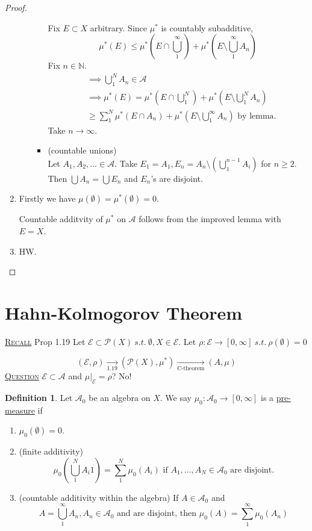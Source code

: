 \documentclass{report}
\newcommand{\N}{\mathbb{N}}
\newcommand{\st}{\ s.t.\ }
\newcommand{\fancyem}[1]{\underline{\textsc{#1}}}
\theoremstyle{definition}
\newtheorem{definition}[theorem]{Definition}
\theoremstyle{remark}
\begin{document}
\begin{proof}
\begin{enumerate}
\begin{enumerate}
\begin{itemize}
		Fix $E \subset X$ arbitrary.
		Since $\mu^*$ is countably subadditive, 
		\[
		\mu^*(E) \leq \mu^*\left(E \cap \bigcup_1^\infty\right) + \mu^*\left(E \setminus \bigcup_1^\infty A_n\right)
		\]
		Fix $n \in \N.$
		\begin{align*}
		& \implies \bigcup_1^N A_n \in \mathcal{A} \\
		& \implies \mu^*(E) = \mu^*\left(E \cap \bigcup_1^N\right) + \mu^*\left(E \setminus \bigcup_1^N A_n\right) \\
		& \geq \sum_{1}^N \mu^*(E \cap A_n) + \mu^*\left(E \setminus \bigcup_1^\infty A_n\right) \text{ by lemma}.
		\end{align*}
		Take $n \to \infty.$
		\item
		(countable unions)\\
		Let $A_1, A_2, \ldots \in \mathcal{A}.$ Take $E_1 = A_1, E_n = A_n \setminus \left(\bigcup_1^{n-1} A_i\right)$ for $n \geq 2.$ Then $\bigcup A_n = \bigcup E_n$ and $E_n$'s are disjoint.
		\end{itemize}
	\end{enumerate}
	\item
	Firstly we have $\mu(\emptyset) = \mu^*(\emptyset) = 0.$
	
	Countable additvity of $\mu^*$ on $\mathcal{A}$ follows from the improved lemma with $E = X$.	
	
	\item
	HW. \qedhere
\end{enumerate}
\end{proof}

\section{Hahn-Kolmogorov Theorem}
\fancyem{Recall} Prop 1.19 Let $\mathcal{E} \subset \mathcal{P}(X) \st \emptyset, X \in \mathcal{E}.$ Let $\rho: \mathcal{E} \to [0, \infty] \st \rho(\emptyset) = 0$

\[
(\mathcal{E}, \rho) \xrightarrow[1.19]{} (\mathcal{P}(X), \mu^*) \xrightarrow[\text{C-theorem}]{} (A, \mu)
\] 
\fancyem{Question} $\mathcal{E} \subset \mathcal{A}$ and $\mu|_\mathcal{E} = \rho$? No!
\begin{definition}
Let $\mathcal{A}_0$ be an algebra on $X$. We say $\mu_0: \mathcal{A}_0 \to [0, \infty]$ is a \underline{pre-measure} if 
\begin{enumerate}
\item $\mu_0(\emptyset) = 0.$
\item (finite additivity)
\[
\mu_0\left(\bigcup_1^N A_i1\right) = \sum_1^N \mu_0(A_i) \text{ if } A_1, \ldots, A_N \in \mathcal{A}_0 \text{ are disjoint.}
\]
\item (countable additivity within the algebra) If $A \in \mathcal{A}_0$ and 
\[
A = \bigcup_1^\infty A_n, A_n \in \mathcal{A}_0 \text{ and are disjoint, then } \mu_0(A) = \sum_1^\infty \mu_0(A_n)
\]
\end{enumerate}
\end{definition}
\end{document}
